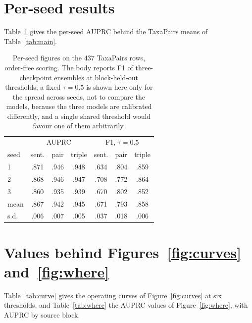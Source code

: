 \documentclass[11pt]{article}
\newcommand{\bench}{\mbox{TaxaPairs}}
\begin{document}
\section{Per-seed results}
\label{app:seeds}

Table~\ref{tab:perseed} gives the per-seed AUPRC behind the \bench{} means of Table~\ref{tab:main}.

\begin{table}[t]\centering\footnotesize
\setlength{\tabcolsep}{2.2pt}
\begin{tabular}{lccc|ccc}
\toprule
 & \multicolumn{3}{c|}{AUPRC} & \multicolumn{3}{c}{F1, $\tau = 0.5$} \\
seed & sent. & pair & triple & sent. & pair & triple \\
\midrule
1 & .871 & .946 & .948 & .634 & .804 & .859 \\
2 & .868 & .946 & .947 & .708 & .772 & .864 \\
3 & .860 & .935 & .939 & .670 & .802 & .852 \\
\midrule
mean & .867 & .942 & .945 & .671 & .793 & .858 \\
s.d. & .006 & .007 & .005 & .037 & .018 & .006 \\
\bottomrule
\end{tabular}
\caption{Per-seed figures on the 437 \bench{} rows, order-free scoring. The body reports F1 of
three-checkpoint ensembles at block-held-out thresholds; a fixed $\tau = 0.5$ is shown here only for
the spread across seeds, not to compare the models, because the three models are calibrated
differently, and a single shared threshold would favour one of them arbitrarily.}
\label{tab:perseed}
\end{table}

\section{\texorpdfstring{Values behind Figures~\ref{fig:curves} and~\ref{fig:where}}{Values behind Figures 2 and 3}}
\label{app:curve}
\label{app:where}

Table~\ref{tab:curve} gives the operating curves of Figure~\ref{fig:curves} at six thresholds, and
Table~\ref{tab:where} the AUPRC values of Figure~\ref{fig:where}, with AUPRC by source block.
\end{document}
